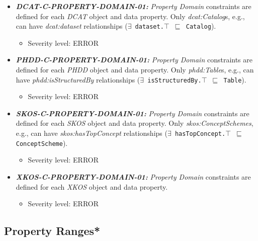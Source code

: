 \documentclass{llncs}
\newcommand{\ms}[1]{\texttt{#1}}
\begin{document}
\begin{itemize}
	\item \textbf{{\em DCAT-C-PROPERTY-DOMAIN-01:}} 
	{\em Property Domain} constraints are defined for each \emph{DCAT} object and data property.
  Only {\em dcat:Catalog}s, e.g., can have {\em dcat:dataset} relationships (\ms{$\exists$ dataset.$\top$ $\sqsubseteq$ Catalog}).
	\begin{itemize}
		\item Severity level: ERROR
	\end{itemize}
\end{itemize}

\begin{itemize}
	\item \textbf{{\em PHDD-C-PROPERTY-DOMAIN-01:}} 
	{\em Property Domain} constraints are defined for each \emph{PHDD} object and data property.
  Only {\em phdd:Table}s, e.g., can have {\em phdd:isStructuredBy} relationships (\ms{$\exists$ isStructuredBy.$\top$ $\sqsubseteq$ Table}).
	\begin{itemize}
		\item Severity level: ERROR
	\end{itemize}
\end{itemize}

\begin{itemize}
	\item \textbf{{\em SKOS-C-PROPERTY-DOMAIN-01:}} 
	{\em Property Domain} constraints are defined for each \emph{SKOS} object and data property.
	Only {\em skos:ConceptSchemes}, e.g., can have {\em skos:hasTopConcept} relationships (\ms{$\exists$ hasTopConcept.$\top$ $\sqsubseteq$ ConceptScheme}).
	\begin{itemize}
		\item Severity level: ERROR
	\end{itemize}
\end{itemize}

\begin{itemize}
	\item \textbf{{\em XKOS-C-PROPERTY-DOMAIN-01:}} 
	{\em Property Domain} constraints are defined for each \emph{XKOS} object and data property.
	\begin{itemize}
		\item Severity level: ERROR
	\end{itemize}
\end{itemize}

\subsection{Property Ranges*}
\end{document}
